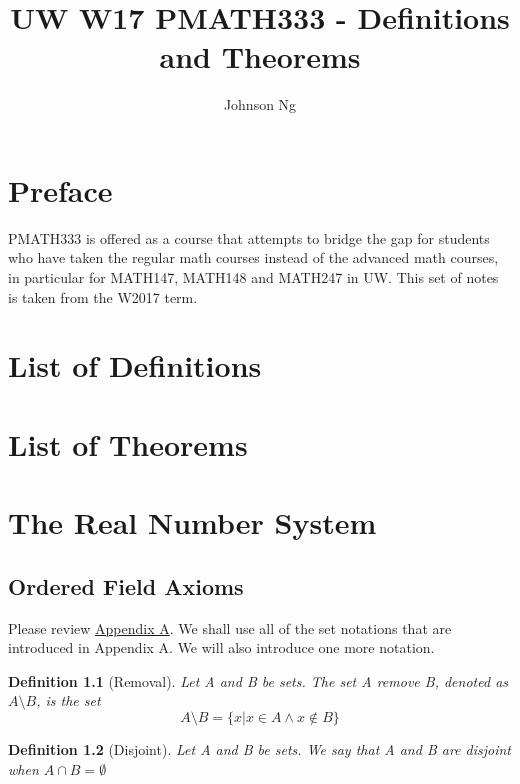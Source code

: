 \documentclass[11pt, oneside]{book}
\title{UW W17 PMATH333 - Definitions and Theorems}
\author{Johnson Ng}
\theoremstyle{break}
\newtheorem{defn}{Definition}[section]
\begin{document}
\maketitle


\chapter*{Preface}
PMATH333 is offered as a course that attempts to bridge the gap for students who have taken the regular math courses instead of the advanced math courses, in particular for MATH147, MATH148 and MATH247 in UW. This set of notes is taken from the W2017 term.

\tableofcontents

\chapter*{List of Definitions}

\chapter*{List of Theorems}



\chapter{The Real Number System}

\section{Ordered Field Axioms}
Please review \hyperref[apdxA]{Appendix A}. We shall use all of the set notations that are introduced in Appendix A. We will also introduce one more notation.

\begin{defn}[Removal]
	Let A and B be sets. The set A remove B, denoted as $A \setminus B$, is the set
	\[
		A \setminus B = \{ x | x \in A \land x \notin B \}
	\]
\end{defn}

\begin{defn}[Disjoint]
	Let A and B be sets. We say that A and B are disjoint when $A \cap B = \emptyset$
\end{defn}
\end{document}

